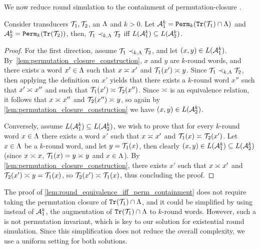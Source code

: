 We now reduce round simulation to the containment of permutation-closure \NFAs.

\begin{lemma}
\label{lem:round_equivalence_iff_perm_containment}
	Consider transducers $\mathcal{T}_1,\mathcal{T}_2$, an \NFA $\Lambda$ and $k>0$. Let $\mathcal{A}_1^k={\mathtt{Perm}}_k({\mathtt{Tr}}(\mathcal{T}_1)\cap\Lambda)$ and $\mathcal{A}_2^k={\mathtt{Perm}}_k({\mathtt{Tr}}(\mathcal{T}_2))$,
	then, $\mathcal{T}_1\prec_{k,\Lambda} \mathcal{T}_2$ iff $L(\mathcal{A}^k_1)\subseteq L(\mathcal{A}^k_2)$.
\end{lemma}
\begin{proof}
	For the first direction, assume $\mathcal{T}_1\prec_{k,\Lambda} \mathcal{T}_2$, and let $(x,y)\in L(\mathcal{A}^k_1)$. By~\autoref{lem:permutation_closure_construction}, $x$ and $y$ are $k$-round words, and there exists a word $x'\in \Lambda$ such that $x\asymp_{} x'$ and $\mathcal{T}_1(x')\asymp_{} y$. Since $\mathcal{T}_1\prec_{k,\Lambda} \mathcal{T}_2$, then applying the definition on $x'$ yields that there exists a $k$-round word $x''$ such that $x'\asymp_{} x''$ and such that $\mathcal{T}_1(x')\asymp_{} \mathcal{T}_2(x'')$. Since $\asymp_{}$ is an equivalence relation, it follows that $x\asymp_{} x''$ and $\mathcal{T}_2(x'')\asymp_{} y$, so again by \autoref{lem:permutation_closure_construction} we have $(x,y)\in L(\mathcal{A}^k_2)$.
	
	Conversely, assume $L(\mathcal{A}^k_1)\subseteq L(\mathcal{A}^k_2)$, we wish to prove that for every $k$-round word $x\in \Lambda$ there exists a word $x'$ such that $x\asymp_{} x'$ and $\mathcal{T}_1(x)\asymp_{} \mathcal{T}_2(x')$. Let $x\in \Lambda$ be a $k$-round word, and let $y=\mathcal{T}_1(x)$, then clearly $(x,y)\in L(\mathcal{A}^k_1)\subseteq L(\mathcal{A}^k_2)$ (since $x\asymp_{} x$, $\mathcal{T}_1(x)=y\asymp_{} y$ and $x\in \Lambda$). By \autoref{lem:permutation_closure_construction}, there exists $x'$ such that $x\asymp_{} x'$ and $\mathcal{T}_2(x')\asymp_{} y=\mathcal{T}_1(x)$, so $\mathcal{T}_2(x')\asymp_{} \mathcal{T}_1(x)$, thus concluding the proof.
\end{proof}

\begin{remark}
\label{rmk:det_A1}
The proof of \autoref{lem:round_equivalence_iff_perm_containment} does not require taking the permutation closure of ${\mathtt{Tr}}(\mathcal{T}_1)\cap \Lambda$, and it could be simplified by using instead of $\mathcal{A}^k_1$, the augmentation of ${\mathtt{Tr}}(\mathcal{T}_1)\cap \Lambda$ to $k$-round words. However, such a \NFA is not permutation invariant, which is key to our solution for existential round simulation. Since this simplification does not reduce the overall complexity, we use a uniform setting for both solutions.
\end{remark}

